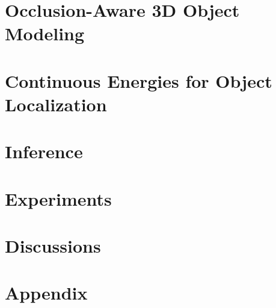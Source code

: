 \documentclass[10pt,letterpaper]{report}
\begin{document}
\chapter{Occlusion-Aware 3D Object Modeling}
\label{sec:TPmodel}

\chapter{Continuous Energies for Object Localization}


%
\chapter{Inference}


%
\chapter{Experiments}

% 
\chapter{Discussions}


\chapter{Appendix}
\label{ref:appendix}


{\small
  
  
}
\end{document}
